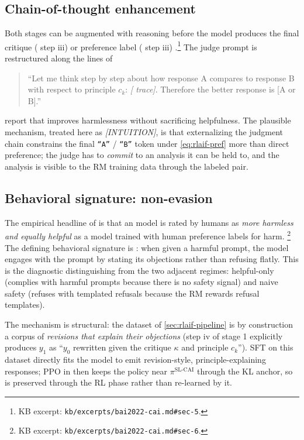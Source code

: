 \subsection{Chain-of-thought enhancement}
\label{sec:rlaif-cot}

Both stages can be augmented with  reasoning before
the model produces the final critique ( step iii) or preference
label ( step iii)
\citep[\S 5]{bai2022-cai}.\footnote{KB excerpt:
\texttt{kb/excerpts/bai2022-cai.md\#sec-5}.} The judge prompt is
restructured along the lines of
\begin{quote}
\small
``Let me think step by step about how response A compares to response
B with respect to principle $c_k$: \emph{[ trace]}. Therefore the
better response is [A or B].''
\end{quote}
\citet[\S 5]{bai2022-cai} report that  improves harmlessness without
sacrificing helpfulness. The plausible mechanism, treated here as
\textit{[INTUITION]}, is that externalizing the judgment chain
constrains the final \texttt{``A''} / \texttt{``B''} token under
\cref{eq:rlaif-pref} more than direct preference; the judge has to
\emph{commit} to an analysis it can be held to, and the analysis is
visible to the RM training data through the labeled pair.

\subsection{Behavioral signature: non-evasion}
\label{sec:rlaif-behavioral}

The empirical headline of \citet[\S 6]{bai2022-cai} is that an 
model is rated by humans as \emph{more harmless and equally helpful}
as a model trained with human preference labels for harm.%
\footnote{KB excerpt: \texttt{kb/excerpts/bai2022-cai.md\#sec-6}.} The
defining behavioral signature is \emph{}: when given a
harmful prompt, the model engages with the prompt by stating its
objections rather than refusing flatly. This is the diagnostic
distinguishing  from the two adjacent regimes: helpful-only 
(complies with harmful prompts because there is no safety signal) and
naive safety  (refuses with templated refusals because the RM
rewards refusal templates).

The mechanism is structural: the  dataset of
\cref{sec:rlaif-pipeline} is by construction a corpus of
\emph{revisions that explain their objections} (step iv of stage 1
explicitly produces $y_1$ as ``$y_0$ rewritten given the critique
$\kappa$ and principle $c_k$''). SFT on this dataset directly fits the
model to emit revision-style, principle-explaining responses; PPO in
 then keeps the policy near $\pi^{\mathrm{SL\text{-}CAI}}$
through the KL anchor, so  is preserved through the RL
phase rather than re-learned by it.

